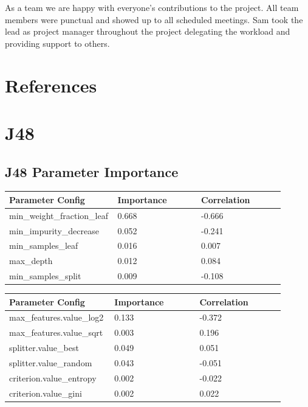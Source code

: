 \documentclass[11pt]{article}
\begin{document}
As a team we are happy with everyone's contributions to the project. All team members were punctual and showed up to all scheduled meetings. Sam took the lead as project manager throughout the project delegating the workload and providing support to others.

\section{References}
\printbibliography

\newpage
\section{J48}

\subsection{J48 Parameter Importance}
  \begin{table}[ht]
    \centering
    \begin{tabular}{|p{0.3\linewidth} | p{0.3\linewidth}| p{0.3\linewidth}|} 
      \hline
      \textbf{Parameter Config}  & \textbf{Importance} & \textbf{Correlation} \\ \hline
        min\_weight\_fraction\_leaf & 0.668  & -0.666 \\ \hline
        min\_impurity\_decrease & 0.052 & -0.241 \\ \hline
        min\_samples\_leaf & 0.016 & 0.007 \\ \hline
        max\_depth & 0.012 & 0.084 \\ \hline
        min\_samples\_split & 0.009 & -0.108 \\ \hline

    \end{tabular}
  \end{table}\label{J48_ParamImp1}

  \begin{table}[ht]
    \centering
    \begin{tabular}{|p{0.3\linewidth} | p{0.3\linewidth}| p{0.3\linewidth}|} 
      \hline
      \textbf{Parameter Config}  & \textbf{Importance} & \textbf{Correlation} \\ \hline
        max\_features.value\_log2 & 0.133 & -0.372 \\ \hline
        max\_features.value\_sqrt & 0.003 & 0.196 \\ \hline
        splitter.value\_best & 0.049 & 0.051 \\ \hline
        splitter.value\_random & 0.043 & -0.051 \\ \hline
        criterion.value\_entropy & 0.002 & -0.022 \\ \hline
        criterion.value\_gini & 0.002 & 0.022 \\ \hline

    \end{tabular}
  \end{table}\label{J48_ParamImp2}
\end{document}
